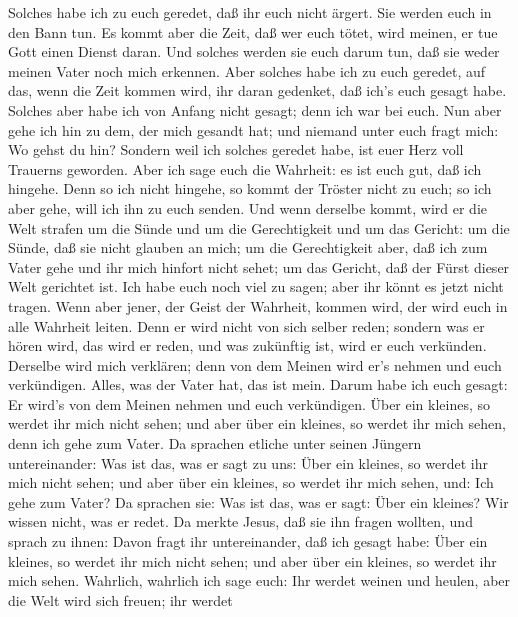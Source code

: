  Solches habe ich zu euch geredet, daß ihr euch nicht
ärgert.  Sie werden euch in den Bann tun. Es kommt aber die
Zeit, daß wer euch tötet, wird meinen, er tue Gott einen Dienst daran.
 Und solches werden sie euch darum tun, daß sie weder meinen
Vater noch mich erkennen.  Aber solches habe ich zu euch
geredet, auf das, wenn die Zeit kommen wird, ihr daran gedenket, daß
ich's euch gesagt habe. Solches aber habe ich von Anfang nicht gesagt;
denn ich war bei euch.  Nun aber gehe ich hin zu dem, der
mich gesandt hat; und niemand unter euch fragt mich: Wo gehst du hin?
 Sondern weil ich solches geredet habe, ist euer Herz voll
Trauerns geworden.  Aber ich sage euch die Wahrheit: es ist
euch gut, daß ich hingehe. Denn so ich nicht hingehe, so kommt der
Tröster nicht zu euch; so ich aber gehe, will ich ihn zu euch senden.
 Und wenn derselbe kommt, wird er die Welt strafen um die
Sünde und um die Gerechtigkeit und um das Gericht:  um die
Sünde, daß sie nicht glauben an mich;  um die Gerechtigkeit
aber, daß ich zum Vater gehe und ihr mich hinfort nicht sehet;
 um das Gericht, daß der Fürst dieser Welt gerichtet ist.
 Ich habe euch noch viel zu sagen; aber ihr könnt es jetzt
nicht tragen.  Wenn aber jener, der Geist der Wahrheit,
kommen wird, der wird euch in alle Wahrheit leiten. Denn er wird nicht
von sich selber reden; sondern was er hören wird, das wird er reden, und
was zukünftig ist, wird er euch verkünden.  Derselbe wird
mich verklären; denn von dem Meinen wird er's nehmen und euch
verkündigen.  Alles, was der Vater hat, das ist mein. Darum
habe ich euch gesagt: Er wird's von dem Meinen nehmen und euch
verkündigen.  Über ein kleines, so werdet ihr mich nicht
sehen; und aber über ein kleines, so werdet ihr mich sehen, denn ich
gehe zum Vater.  Da sprachen etliche unter seinen Jüngern
untereinander: Was ist das, was er sagt zu uns: Über ein kleines, so
werdet ihr mich nicht sehen; und aber über ein kleines, so werdet ihr
mich sehen, und: Ich gehe zum Vater?  Da sprachen sie: Was
ist das, was er sagt: Über ein kleines? Wir wissen nicht, was er redet.
 Da merkte Jesus, daß sie ihn fragen wollten, und sprach zu
ihnen: Davon fragt ihr untereinander, daß ich gesagt habe: Über ein
kleines, so werdet ihr mich nicht sehen; und aber über ein kleines, so
werdet ihr mich sehen.  Wahrlich, wahrlich ich sage euch:
Ihr werdet weinen und heulen, aber die Welt wird sich freuen; ihr werdet
